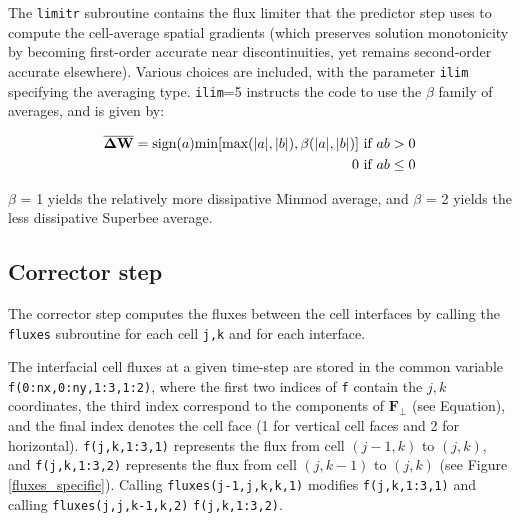 \documentclass{article}
\newcommand{\code}[1]{\texttt{#1}}
\begin{document}
The \code{limitr} subroutine contains the flux limiter that the predictor step uses to compute the cell-average spatial gradients (which preserves solution monotonicity by becoming first-order accurate near discontinuities, yet remains second-order accurate elsewhere).
Various choices are included, with the parameter \code{ilim} specifying the averaging type. \code{ilim}=5 instructs the code to use the $\beta$ family of averages, and is given by:

\begin{eqnarray*}
	\mathbf{\overline{\Delta W}} = \text{sign}(a)\text{min}[\text{max}(|a|, |b|), \beta(|a|, |b|)]  \textmd{ if }  ab>0  \\ 
	0 \textmd{ if }  ab \leq 0	
\end{eqnarray*}

$\beta$ = 1 yields the relatively more dissipative Minmod average, and $\beta $ = 2 yields the less dissipative Superbee average. 


\subsection{Corrector step}

The corrector step computes the fluxes between the cell interfaces by calling the \code{fluxes} subroutine for each cell \code{j,k} and for each interface. 

The interfacial cell fluxes at a given time-step are stored in the common variable \code{f(0:nx,0:ny,1:3,1:2)}, where the first two indices of \code{f} contain the $j,k$ coordinates, the third index correspond to the components of  $\mathbf{F_\perp}$ (see Equation), and the final index denotes the cell face (1 for vertical cell faces and 2 for horizontal).   
\code{f(j,k,1:3,1)} represents the flux from cell $(j-1, k)$ to $(j, k)$, and
\code{f(j,k,1:3,2)} represents the flux from cell $(j, k-1)$ to $(j, k)$ (see Figure \ref{fluxes_specific}).
Calling \code{fluxes(j-1,j,k,k,1)} modifies \code{f(j,k,1:3,1)}  and calling \code{fluxes(j,j,k-1,k,2)} \code{f(j,k,1:3,2)}.
\end{document}
